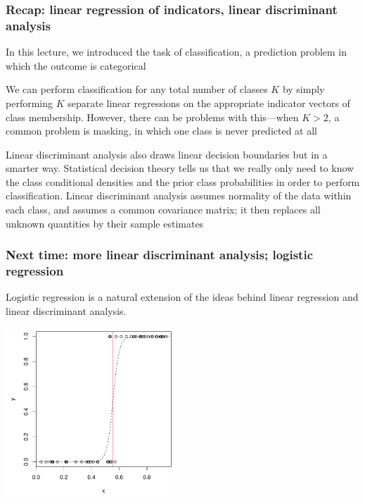 \documentclass[mathserif]{beamer}
\def\red{\color[rgb]{0.8,0,0}}
\begin{document}
\begin{frame}
\frametitle{Recap: linear regression of indicators, linear
discriminant analysis}
\smallskip
In this lecture, we introduced the task of {\red classification},
a prediction problem in which the outcome is categorical

\bigskip
We can perform classification for any total number of classes $K$ by simply 
performing $K$ separate {\red linear regressions} on the appropriate 
{\red indicator vectors} of class membership.
However, there can be problems with this---when $K>2$,
a common problem is masking, in which one class is never
predicted at all

\bigskip
{\red Linear discriminant analysis} also draws linear decision 
boundaries but in a smarter way. Statistical decision theory tells
us that we really only need to know the class conditional densities
and the prior class probabilities in order to perform classification.
Linear discriminant analysis assumes normality of the data within
each class, and assumes a common covariance matrix; it then replaces
all unknown quantities by their sample estimates

\smallskip
\end{frame}

\begin{frame}
\frametitle{Next time: more linear discriminant analysis; logistic 
regression}
\smallskip
\smallskip
Logistic regression is a natural extension of the ideas behind linear
regression and linear discriminant analysis.
\smallskip
\begin{center}
\includegraphics[width=2.5in]{logr.pdf}
\end{center}
\end{frame}
\end{document}
